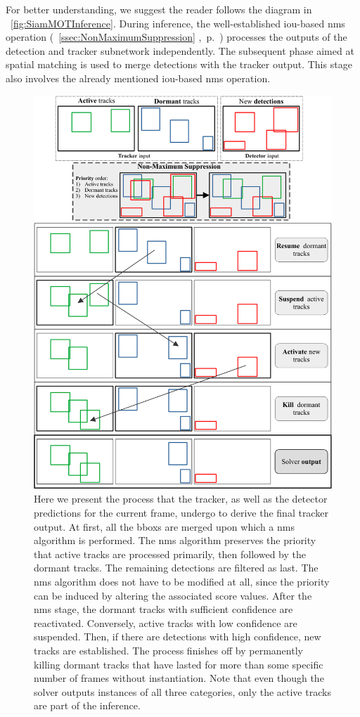 For better understanding, we suggest the reader follows the diagram in \figtext{}~\ref{fig:SiamMOTInference}. During inference, the well-established \gls{iou}-based \gls{nms} operation (\sectiontext{}~\ref{ssec:NonMaximumSuppression} ,~p.~\pageref{ssec:NonMaximumSuppression}) processes the outputs of the detection and tracker subnetwork independently. The subsequent phase aimed at spatial matching is used to merge detections with the tracker output. This stage also involves the already mentioned \gls{iou}-based \gls{nms} operation.

\begin{figure}[!t]
    \centering
    \includegraphics[width=0.85\linewidth]{figures/siamese_tracking/siammot_online_solver.pdf}
    \caption[\gls{siammot} online solver]{Here we present the process that the tracker, as well as the detector predictions for the current frame, undergo to derive the final tracker output. At first, all the \glspl{bbox} are merged upon which a \gls{nms} algorithm is performed. The \gls{nms} algorithm preserves the priority that active tracks are processed primarily, then followed by the dormant tracks. The remaining detections are filtered as last. The \gls{nms} algorithm does not have to be modified at all, since the priority can be induced by altering the associated score values. After the \gls{nms} stage, the dormant tracks with sufficient confidence are reactivated. Conversely, active tracks with low confidence are suspended. Then, if there are detections with high confidence, new tracks are established. The process finishes off by permanently killing dormant tracks that have lasted for more than some specific number of frames without instantiation. Note that even though the solver outputs instances of all three categories, only the active tracks are part of the inference.}
    \label{fig:SiamMOTOnlineSolver}
\end{figure}
